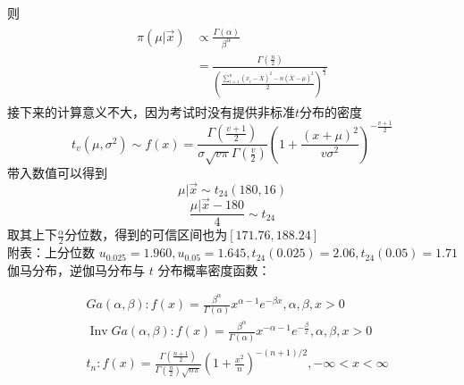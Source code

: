 \documentclass[UTF8,openany]{book}
\begin{document}
	则
	\begin{gather}
		\begin{aligned}
			\pi(\mu|\vec{x}) & \propto \frac{\Gamma(\alpha)}{\beta^{\alpha}}\\
			&=\frac{\Gamma(\frac{n}{2})}{(\frac{\sum_{i=1}^n  (x_i-\overline{X})^2-n(\overline{X}-\mu)^2}{2})^{\frac{n}{2}}}
		\end{aligned}
	\end{gather}
	接下来的计算意义不大，因为考试时没有提供非标准$t$分布的密度\\
	\[
	t_v(\mu,\sigma^2) \sim f(x)=\frac{\Gamma(\frac{v+1}{2})}{\sigma \sqrt{v\pi} \Gamma(\frac{v}{2})}(1+\frac{(x+\mu)^2}{v\sigma^2})^{-\frac{v+1}{2}}
	\]
	带入数值可以得到
	\[
	\mu|\vec{x} \sim t_{24}(180,16)
	\]
	\[
	\frac{\mu|\vec{x}-180}{4} \sim t_{24}
	\]
	取其上下$\frac{\alpha}{2}$分位数，得到的可信区间也为$[171.76,188.24]$\\
	
	
	
	\noindent 附表：上分位数 $u_{0.025}=1.960, u_{0.05}=1.645, t_{24}(0.025)=2.06, t_{24}(0.05)=1.71$\\
	伽马分布，逆伽马分布与 $t$ 分布概率密度函数：
	
	$$
	\begin{aligned}
		& G a(\alpha, \beta): f(x)=\frac{\beta^{\alpha}}{\Gamma(\alpha)} x^{\alpha-1} e^{-\beta x}, \alpha, \beta, x>0 \\
		& \operatorname{Inv} G a(\alpha, \beta): f(x)=\frac{\beta^{\alpha}}{\Gamma(\alpha)} x^{-\alpha-1} e^{-\frac{\beta}{x}}, \alpha, \beta, x>0 \\
		& t_{n}: f(x)=\frac{\Gamma\left(\frac{n+1}{2}\right)}{\Gamma\left(\frac{n}{2}\right) \sqrt{n \pi}}\left(1+\frac{x^{2}}{n}\right)^{-(n+1) / 2},-\infty<x<\infty
	\end{aligned}
	$$
	\newpage
\end{document}
